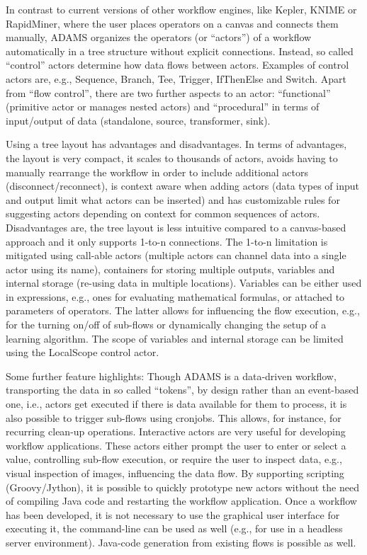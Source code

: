 \documentclass{llncs}
\begin{document}
In contrast to current versions of other workflow engines, like Kepler, KNIME
or RapidMiner, where the user places operators on a canvas and connects them
manually, ADAMS organizes the operators (or “actors”) of a workflow
automatically in a tree structure without explicit connections. Instead, so
called “control” actors determine how data flows between actors. Examples of
control actors are, e.g., Sequence, Branch, Tee, Trigger, IfThenElse and
Switch. Apart from “flow control”, there are two further aspects to an actor:
“functional” (primitive actor or manages nested actors) and “procedural” in
terms of input/output of data (standalone, source, transformer, sink).

Using a tree layout has advantages and disadvantages. In terms of advantages,
the layout is very compact, it scales to thousands of actors, avoids
having to manually rearrange the workflow in order to include additional
actors (disconnect/reconnect), is context aware when adding actors (data
types of input and output limit what actors can be inserted) and has
customizable rules for suggesting actors depending on context for common
sequences of actors. Disadvantages are, the tree layout is less intuitive
compared to a canvas-based approach and it only supports 1-to-n connections.
The 1-to-n limitation is mitigated using call-able actors (multiple actors can
channel data into a single actor using its name), containers for storing
multiple outputs, variables and internal storage (re-using data in multiple
locations). Variables can be either used in expressions, e.g., ones for
evaluating mathematical formulas, or attached to parameters of operators. The
latter allows for influencing the flow execution, e.g., for the turning on/off
of sub-flows or dynamically changing the setup of a learning algorithm. The
scope of variables and internal storage can be limited using the LocalScope
control actor.

Some further feature highlights: Though ADAMS is a data-driven workflow,
transporting the data in so called “tokens”, by design rather than an
event-based one, i.e., actors get executed if there is data available for them
to process, it is also possible to trigger sub-flows using cronjobs.  This
allows, for instance, for recurring clean-up operations. Interactive actors are
very useful for developing workflow applications. These actors either prompt
the user to enter or select a value, controlling sub-flow execution, or require
the user to inspect data, e.g., visual inspection of images, influencing the
data flow. By supporting scripting (Groovy/Jython), it is possible to quickly
prototype new actors without the need of compiling Java code and restarting the
workflow application.  Once a workflow has been developed, it is not necessary
to use the graphical user interface for executing it, the command-line can be
used as well (e.g., for use in a headless server environment). Java-code
generation from existing flows is possible as well.
\end{document}
